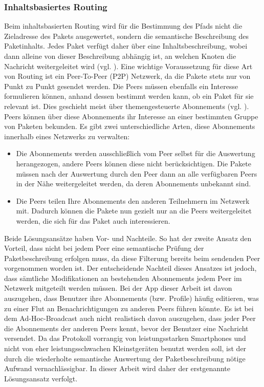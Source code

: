 \subsubsection{Inhaltsbasiertes Routing}
Beim inhaltsbasierten Routing wird für die Bestimmung des Pfads nicht die Zieladresse des Pakets ausgewertet, sondern die semantische Beschreibung des Paketinhalts. Jedes Paket verfügt daher über eine Inhaltsbeschreibung, wobei dann alleine von dieser Beschreibung abhängig ist, an welchen Knoten die Nachricht weitergeleitet wird (vgl. \citet[S. 649]{Tanenbaum2007}). Eine wichtige Voraussetzung für diese Art von Routing ist ein Peer-To-Peer (P2P) Netzwerk, da die Pakete stets nur von Punkt zu Punkt gesendet werden. Die Peers müssen ebenfalls ein Interesse formulieren können, anhand dessen bestimmt werden kann, ob ein Paket für sie relevant ist. Dies geschieht meist über themengesteuerte Abonnements (vgl. \citet[S. 650f]{Tanenbaum2007}). Peers können über diese Abonnements ihr Interesse an einer bestimmten Gruppe von Paketen bekunden. Es gibt zwei unterschiedliche Arten, diese Abonnements innerhalb eines Netzwerks zu verwalten:
\begin{itemize}
	\item Die Abonnements werden ausschließlich vom Peer selbst für die Auswertung herangezogen, andere Peers können diese nicht berücksichtigen. Die Pakete müssen nach der Auswertung durch den Peer dann an alle verfügbaren Peers in der Nähe weitergeleitet werden, da deren Abonnements unbekannt sind. 
	\item Die Peers teilen Ihre Abonnements den anderen Teilnehmern im Netzwerk mit. Dadurch können die Pakete nun gezielt nur an die Peers weitergeleitet werden, die sich für das Paket auch interessieren.
\end{itemize}
Beide Lösungsansätze haben Vor- und Nachteile. So hat der zweite Ansatz den Vorteil, dass nicht bei jedem Peer eine semantische Prüfung der Paketbeschreibung erfolgen muss, da diese Filterung bereits beim sendenden Peer vorgenommen worden ist. Der entscheidende Nachteil dieses Ansatzes ist jedoch, dass sämtliche Modifikationen an bestehenden Abonnements jedem Peer im Netzwerk mitgeteilt werden müssen. Bei der App dieser Arbeit ist davon auszugehen, dass Benutzer ihre Abonnements (bzw. Profile) häufig editieren, was zu einer Flut an Benachrichtigungen zu anderen Peers führen könnte. Es ist bei dem Ad-Hoc-Broadcast auch nicht realistisch davon auszugehen, dass jeder Peer die Abonnements der anderen Peers kennt, bevor der Benutzer eine Nachricht versendet. Da das Protokoll vorrangig von leistungsstarken Smartphones und nicht von eher leistungsschwachen Kleinstgeräten benutzt werden soll, ist der durch die wiederholte semantische Auswertung der Paketbeschreibung nötige Aufwand vernachlässigbar. In dieser Arbeit wird daher der erstgenannte Lösungsansatz verfolgt. 
